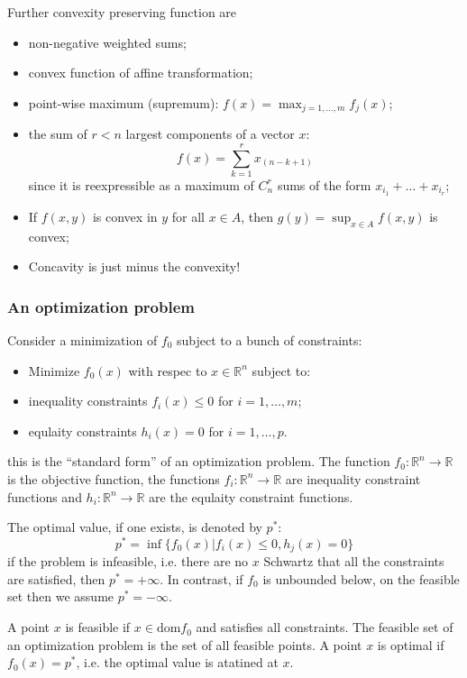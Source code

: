 \documentclass[a4paper]{article}
\newcommand{\Real}{\mathbb{R}}
\begin{document}
Further convexity preserving function are 
\begin{itemize}
	\item non-negative weighted sums;
	\item convex function of affine transformation; 
	\item point-wise maximum (supremum): $f(x) = \max_{j=1,\ldots,m}f_j(x)$;
	\item the sum of $r<n$ largest components of a vector $x$:
	\[f(x) = \sum_{k=1}^r x_{(n-k+1)}\]
	since it is reexpressible as a maximum of $C^r_n$ sums of the form $x_{i_1} + \ldots + x_{i_r}$;
	\item If $f(x,y)$ is convex in $y$ for all $x\in A$, then $g(y) = \sup_{x\in A} f(x,y)$ is convex;
	\item Concavity is just minus the convexity!
\end{itemize}


\subsubsection{An optimization problem} %
\label{ssub:an_optimization_problem}

Consider a minimization of $f_0$ subject to a bunch of constraints:
\begin{itemize}
	\item Minimize $f_0(x)$ with respec to $x\in \Real^n$ subject to:
	\item inequality constraints $f_i(x) \leq 0$ for $i=1,\ldots,m$;
	\item equlaity constraints $h_i(x) = 0$ for $i=1,\ldots,p$.
\end{itemize}
this is the ``standard form'' of an optimization problem.
The function $f_0:\Real^n \to \Real$ is the objective function, the functions
$f_i:\Real^n\to\Real$ are inequality constraint functions and $h_i:\Real^n\to\Real$
are the equlaity constraint functions.

The optimal value, if one exists, is denoted by $p^*$:
\[p^* = \inf\{ f_0(x) \rvert f_i(x) \leq 0, h_j(x) = 0 \}\]
if the problem is infeasible, i.e. there are no $x$ Schwartz that all the constraints
are satisfied, then $p^*=+\infty$. In contrast, if $f_0$ is unbounded below, on the
feasible set then we assume $p^* = -\infty$.

A point $x$ is feasible if $x\in \text{dom}f_0$ and satisfies all constraints. The
feasible set of an optimization problem is the set of all feasible points. A point
$x$ is optimal if $f_0(x) = p^*$, i.e. the optimal value is atatined at $x$.
\end{document}
